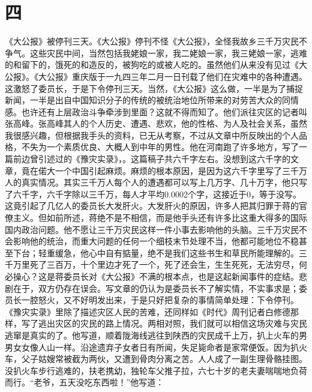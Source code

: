 \fancyhead[RO]{\thepage} %
\fancyhead[LE]{\thepage} %
\fancyfoot[LE,RO]{}
\fancyfoot[LO,CE]{}
\fancyfoot[CO,RE]{}
\chapter*{四}
《大公报》被停刊三天。《大公报》停刊不怪《大公报》，全怪我故乡三千万灾民不争气。这些灾民中间，当然包括我姥娘一家，我二姥娘一家，我三姥娘一家，逃难的和留下的，饿死的和造反的，被狗吃的或被人吃的。虽然他们从来没有见过《大公报》。《大公报》重庆版于一九四三年二月一日刊载了他们在灾难中的各种遭遇。这激怒了委员长，于是下令停刊三天。当然，《大公报》这么做，一半是为了捕捉新闻，一半是出自中国知识分子的传统的被统治地位所带来的对劳苦大众的同情感。也许还有上层政治斗争牵涉到里面？这就不得而知了。他们派往灾区的记者叫张高峰。张高峰其人的个人历史、遭遇、悲欢，他的性格、为人及社会关系，虽然我很感兴趣，但根据我手头的资料，已无从考察，不过从文章中所反映出的个人品格，不失为一个素质优良、大概人到中年的男性。他在河南跑了许多地方，写了一篇前边曾引述过的《豫灾实录》，。这篇稿子共六千字左右。没想到这六千字的文章，竟在偌大一个中国引起麻烦。麻烦的根本原因，是因为这六千字里写了三千万人的真实情况。其实三千万人每个人的遭遇都可以写上几万字、几十万字，他只写了六千字，六千字除以三千万，每人才平均0.0002个字，这接近于0，等于没写。这竟引起了几亿人的委员长大发肝火。大发肝火的原因，许多人把其归罪于蒋的官僚主义。但如前所述，蒋绝不是不相信，而是他手头还有许多比这重大得多的国际国内政治问题。他不愿让三千万灾民这样一件小事去影响他的头脑。三千万灾民不会影响他的统治，而重大问题的任何一个细枝末节处理不当，他都可能地位不稳甚至下台；轻重缓急，他心中自有掂量，绝不是我们这些书生和草民所能理解的。三千万里死了三百万，十个里边才死了一个，死了还会生，生生死死，无法穷尽，何必操心？这是蒋委员长对《大公报》不满的根本点，也是这起新闻事件的症结。悲剧在于，双方仍存在误会。写文章的仍认为是委员长不了解实情，不实事求是；委员长一腔怒火，又不好明发出来，于是只好把复杂的事情简单处理：下令停刊。\\

《豫灾实录》里除了描述灾区人民的苦难，还同样如《时代》周刊记者白修德那样，写了逃出灾区的灾民的路上情况。两相对照，我们就可以相信这场灾难与灾民逃窜是真实的了。他写道，顺着陇海线逃往到陕西的灾民成千上万，扒上火车的男男女女像人山一样。沿途遗弃子女者日有所闻，失足毙命者是家常便饭。因为扒火车，父子姑嫂常被截为两伙，又遭到骨肉分离之苦。人人成了一副生理骨骼挂图。没扒火车步行逃难的，扶老携幼，独轮车父推子拉，六七十岁的老夫妻喘喘地负荷而行。“老爷，五天没吃东西啦！”他写道：\\

